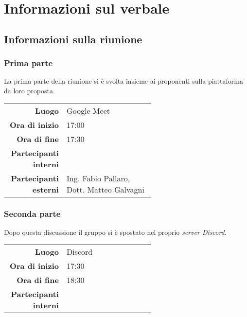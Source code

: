\section{Informazioni sul verbale}

\subsection{Informazioni sulla riunione}

\subsubsection{Prima parte}
La prima parte della riunione si è svolta insieme ai proponenti sulla piattaforma da loro proposta.

\begin{center}
	\begin{tabular}{r|p{0.6\linewidth}}
		\toprule
		\textbf{Luogo} & Google Meet \\
		\textbf{Ora di inizio} & 17:00 \\
		\textbf{Ora di fine} & 17:30 \\
		\textbf{Partecipanti interni} & \groupTeam \\
		\textbf{Partecipanti esterni} & Ing. Fabio Pallaro, Dott. Matteo Galvagni
	\end{tabular}
\end{center}

\subsubsection{Seconda parte}
Dopo questa discussione il gruppo si è spostato nel proprio \textit{server Discord}.

\begin{center}
	\begin{tabular}{r|p{0.6\linewidth}}
		\toprule
		\textbf{Luogo} & Discord \\
		\textbf{Ora di inizio} & 17:30 \\
		\textbf{Ora di fine} & 18:30 \\
		\textbf{Partecipanti interni} & \groupTeam
	\end{tabular}
\end{center}

\medskip


